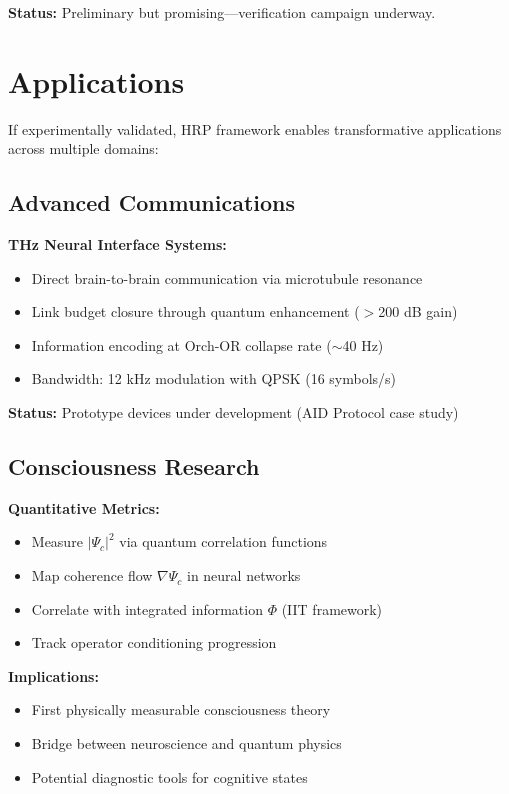 \textbf{Status:} Preliminary but promising---verification campaign underway.

\section{Applications}
\label{sec:applications}

If experimentally validated, HRP framework enables transformative applications across multiple domains:

\subsection{Advanced Communications}
\label{subsec:app-comms}

\textbf{THz Neural Interface Systems:}
\begin{itemize}
\item Direct brain-to-brain communication via microtubule resonance
\item Link budget closure through quantum enhancement ($>$200 dB gain)
\item Information encoding at Orch-OR collapse rate ($\sim$40 Hz)
\item Bandwidth: 12 kHz modulation with QPSK (16 symbols/s)
\end{itemize}

\textbf{Status:} Prototype devices under development (AID Protocol case study)

\subsection{Consciousness Research}
\label{subsec:app-consciousness}

\textbf{Quantitative Metrics:}
\begin{itemize}
\item Measure $|\Psi_c|^2$ via quantum correlation functions
\item Map coherence flow $\nabla\Psi_c$ in neural networks
\item Correlate with integrated information $\Phi$ (IIT framework)
\item Track operator conditioning progression
\end{itemize}

\textbf{Implications:}
\begin{itemize}
\item First physically measurable consciousness theory
\item Bridge between neuroscience and quantum physics
\item Potential diagnostic tools for cognitive states
\end{itemize}

